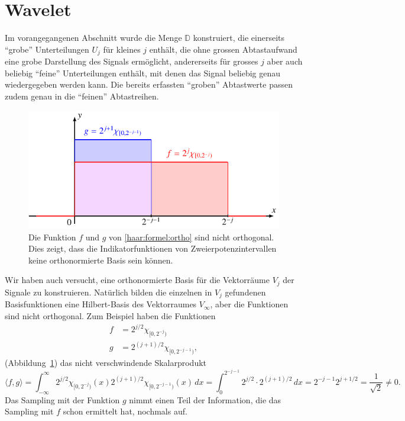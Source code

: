 %
%
%
\section{Wavelet%
\label{section:haar-wavelet}}
Im vorangegangenen Abschnitt wurde die Menge $\mathbb D$ konstruiert, die
einerseits ``grobe'' Unterteilungen $U_j$ für kleines $j$ enthält, die ohne
grossen Abtastaufwand eine grobe Darstellung des Signals ermöglicht,
andererseits für grosses $j$ aber auch beliebig ``feine'' Unterteilungen
enthält, mit denen das Signal beliebig genau wiedergegeben werden kann.
Die bereits erfassten ``groben'' Abtastwerte passen zudem genau in die
``feinen'' Abtastreihen.

\begin{figure}
\centering
\includegraphics{chapters/3-haar/images/ortho.pdf}
\caption{Die Funktion $f$ und $g$ von \eqref{haar:formel:ortho} sind
nicht orthogonal.
Dies zeigt, dass die Indikatorfunktionen von Zweierpotenzintervallen
keine orthonormierte Basis sein können.
\label{haar:figure:ortho}}
\end{figure}
Wir haben auch versucht, eine orthonormierte Basis für die Vektorräume
$V_j$ der Signale zu konstruieren.
Natürlich bilden die einzelnen in $V_j$ gefundenen Basisfunktionen eine 
Hilbert-Basis des Vektorraumes $V_\infty$, aber die Funktionen sind
nicht orthogonal.
Zum Beispiel haben die Funktionen 
\begin{equation}
\begin{aligned}
f&=2^{j/2}\chi_{[0,2^{-j})}
\\
g&=2^{(j+1)/2}\chi_{[0,2^{-j-1})},
\end{aligned}
\label{haar:formel:ortho}
\end{equation}
(Abbildung~\ref{haar:figure:ortho})
das nicht verschwindende Skalarprodukt
\[
\langle f,g\rangle 
=
\int_{-\infty}^\infty
2^{j/2}\chi_{[0,2^{-j})}(x)
2^{(j+1)/2}\chi_{[0,2^{-j-1})}(x)\,dx
=
\int_0^{2^{-j-1}} 2^{j/2}\cdot 2^{(j+1)/2}\,dx
=
2^{-j-1}2^{j + 1/2}
=
\frac{1}{\sqrt{2}}\ne 0.
\]
Das Sampling mit der Funktion $g$ nimmt einen Teil der Information,
die das Sampling mit $f$ schon ermittelt hat, nochmals auf.

